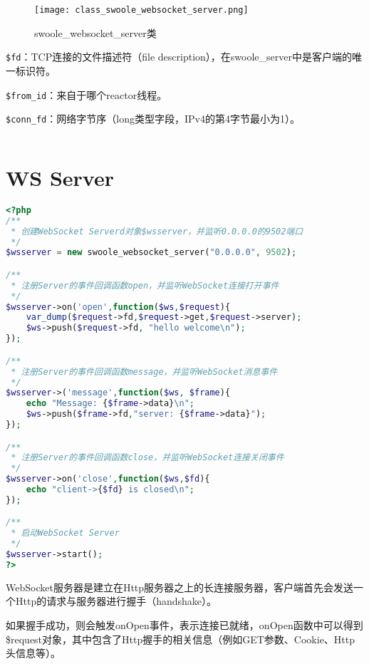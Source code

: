\begin{figure}[htbp]
\centering
\texttt{[image: class\_swoole\_websocket\_server.png]}
\caption{swoole\_websocket\_server类}
\end{figure}

\begin{compactitem}
\item \texttt{\$fd}：TCP连接的文件描述符（file description），在swoole\_server中是客户端的唯一标识符。
\item \texttt{\$from\_id}：来自于哪个reactor线程。
\item \texttt{\$conn\_fd}：网络字节序（long类型字段，IPv4的第4字节最小为1）。
\end{compactitem}


\begin{lstlisting}[language=PHP]

\end{lstlisting}


\section{WS Server}


\begin{lstlisting}[language=PHP]
<?php
/**
 * 创建WebSocket Serverd对象$wsserver，并监听0.0.0.0的9502端口
 */
$wsserver = new swoole_websocket_server("0.0.0.0", 9502);

/**
 * 注册Server的事件回调函数open，并监听WebSocket连接打开事件
 */
$wsserver->on('open',function($ws,$request){
	var_dump($request->fd,$request->get,$request->server);
	$ws->push($request->fd, "hello welcome\n");
});

/**
 * 注册Server的事件回调函数message，并监听WebSocket消息事件
 */
$wsserver->('message',function($ws, $frame){
	echo "Message: {$frame->data}\n";
	$ws->push($frame->fd,"server: {$frame->data}");
});

/**
 * 注册Server的事件回调函数close，并监听WebSocket连接关闭事件
 */
$wsserver->on('close',function($ws,$fd){
	echo "client->{$fd} is closed\n";
});

/**
 * 启动WebSocket Server
 */
$wsserver->start();
?>
\end{lstlisting}

WebSocket服务器是建立在Http服务器之上的长连接服务器，客户端首先会发送一个Http的请求与服务器进行握手（handshake）。

如果握手成功，则会触发onOpen事件，表示连接已就绪，onOpen函数中可以得到\$request对象，其中包含了Http握手的相关信息（例如GET参数、Cookie、Http头信息等）。

